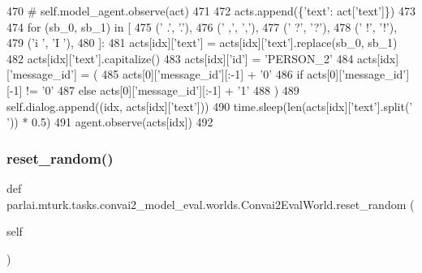 \begin{DoxyCode}
470         \textcolor{comment}{# self.model\_agent.observe(act)}
471 
472         acts.append(\{\textcolor{stringliteral}{'text'}: act[\textcolor{stringliteral}{'text'}]\})
473 
474         \textcolor{keywordflow}{for} (sb\_0, sb\_1) \textcolor{keywordflow}{in} [
475             (\textcolor{stringliteral}{' .'}, \textcolor{stringliteral}{'.'}),
476             (\textcolor{stringliteral}{' ,'}, \textcolor{stringliteral}{','}),
477             (\textcolor{stringliteral}{' ?'}, \textcolor{stringliteral}{'?'}),
478             (\textcolor{stringliteral}{' !'}, \textcolor{stringliteral}{'!'}),
479             (\textcolor{stringliteral}{'i '}, \textcolor{stringliteral}{'I '}),
480         ]:
481             acts[idx][\textcolor{stringliteral}{'text'}] = acts[idx][\textcolor{stringliteral}{'text'}].replace(sb\_0, sb\_1)
482         acts[idx][\textcolor{stringliteral}{'text'}].capitalize()
483         acts[idx][\textcolor{stringliteral}{'id'}] = \textcolor{stringliteral}{'PERSON\_2'}
484         acts[idx][\textcolor{stringliteral}{'message\_id'}] = (
485             acts[0][\textcolor{stringliteral}{'message\_id'}][:-1] + \textcolor{stringliteral}{'0'}
486             \textcolor{keywordflow}{if} acts[0][\textcolor{stringliteral}{'message\_id'}][-1] != \textcolor{stringliteral}{'0'}
487             \textcolor{keywordflow}{else} acts[0][\textcolor{stringliteral}{'message\_id'}][:-1] + \textcolor{stringliteral}{'1'}
488         )
489         self.dialog.append((idx, acts[idx][\textcolor{stringliteral}{'text'}]))
490         time.sleep(len(acts[idx][\textcolor{stringliteral}{'text'}].split(\textcolor{stringliteral}{' '})) * 0.5)
491         agent.observe(acts[idx])
492 
\end{DoxyCode}
\mbox{\label{classparlai_1_1mturk_1_1tasks_1_1convai2__model__eval_1_1worlds_1_1Convai2EvalWorld_a5ddc0b7a6cc22dcfc9da077e70fd7f44}} 
\subsubsection{\texorpdfstring{reset\+\_\+random()}{reset\_random()}}
{\footnotesize\ttfamily def parlai.\+mturk.\+tasks.\+convai2\+\_\+model\+\_\+eval.\+worlds.\+Convai2\+Eval\+World.\+reset\+\_\+random (\begin{DoxyParamCaption}\item[{}]{self }\end{DoxyParamCaption})}



